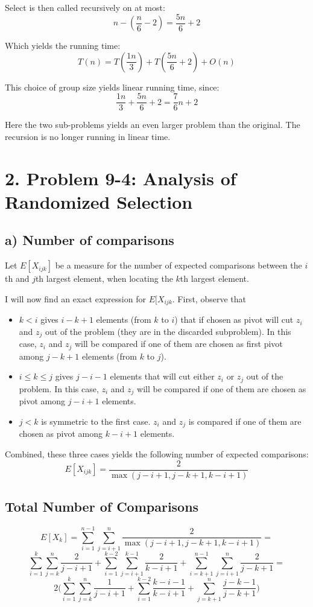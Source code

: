 \documentclass[10pt,oneside,a4paper,final,english]{memoir}
\begin{document}
Select is then called recursively on at most:
\[ n - (\frac{n}{6} - 2) = \frac{5n}{6} + 2 \]

Which yields the running time:
\[ T(n) = T(\frac{1n}{3}) + T(\frac{5n}{6} + 2) + O(n) \]

This choice of group size yields linear running time, since:
\[ \frac{1n}{3} + \frac{5n}{6} + 2 = \frac{7}{6}n + 2\]

Here the two sub-problems yields an even larger problem than the
original. The recursion is no longer running in linear time.



\section*{2. Problem 9-4: Analysis of Randomized Selection}
\subsection{a) Number of comparisons}

Let $E[X_{ijk}]$ be a measure for the number of expected comparisons
between the $i$th and $j$th largest element, when locating the $k$th
largest element.

I will now find an exact expression for $E[X_{ijk}$. First, observe
that
\begin{itemize}
\item $k < i$ gives $i - k + 1$ elements (from $k$ to $i$) that if
  chosen as pivot will cut $z_i$ and $z_j$ out of the problem (they
  are in the discarded subproblem). In this case, $z_i$ and $z_j$ will
  be compared if one of them are chosen as first pivot among $j - k +
  1$ elements (from $k$ to $j$).
\item $i \leq k \leq j$ gives $j-i-1$ elements that will cut either
  $z_i$ or $z_j$ out of the problem. In this case, $z_i$ and $z_j$
  will be compared if one of them are chosen as pivot among $j-i+1$
  elements.
\item $j < k$ is symmetric to the first case. $z_i$ and $z_j$ is
  compared if one of them are chosen as pivot among $k-i+1$ elements.
\end{itemize}

Combined, these three cases yields the following number of expected
comparisons:
\[ E[X_{ijk}] = \frac2{\max(j-i+1, j-k+1, k-i+1)} \]

\subsection{Total Number of Comparisons}
\[ E[X_{k}] = \sum_{i=1}^{n-1} \sum_{j=i+1}^n \frac2{\max(j-i+1, j-k+1,
  k-i+1)} = \]
\[
\sum_{i=1}^k \sum_{j=k}^n \frac2{j-i+1} +
\sum_{i=1}^{k-2} \sum_{j=i+1}^{k-1} \frac2{k-i+1} +
\sum_{i=k+1}^{n-1} \sum_{j=i+1}^n \frac2{j-k+1} = \]
\[ 2 \Big(\sum_{i=1}^k \sum_{j=k}^n \frac1{j-i+1} +
\sum_{i=1}^{k-2} \frac{k-i-1}{k-i+1} +
\sum_{j=k+1}^{n} \frac{j-k-1}{j-k+1}
 \Big)\]
\end{document}
